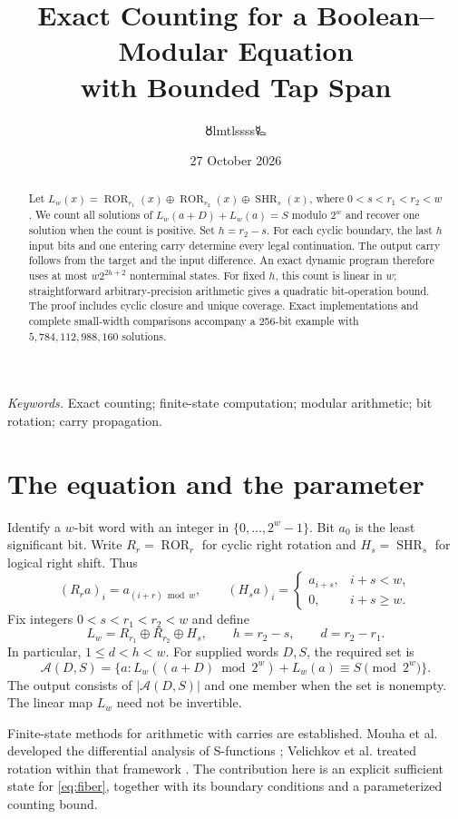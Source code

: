 \documentclass[11pt,a4paper]{article}
\title{\LARGE Exact Counting for a Boolean--Modular Equation\\with Bounded Tap Span}
\author{{\authorsymbol 🜘}lmtlssss{\authorsymbol 🜐}}
\date{27 October 2026}
\theoremstyle{definition}\newtheorem{definition}[theorem]{Definition}
\newcommand{\rot}{\operatorname{ROR}}
\newcommand{\shr}{\operatorname{SHR}}
\begin{document}
\maketitle\thispagestyle{plain}
\begin{abstract}
Let $L_w(x)=\rot_{r_1}(x)\oplus\rot_{r_2}(x)\oplus\shr_s(x)$, where
$0<s<r_1<r_2<w$. We count all solutions of
$L_w(a+D)+L_w(a)=S$ modulo $2^w$ and recover one solution when the count is positive.
Set $h=r_2-s$. For each cyclic boundary, the last $h$ input bits and one entering
carry determine every legal continuation. The output carry follows from the target
and the input difference. An exact dynamic program therefore uses at most
$w2^{2h+2}$ nonterminal states. For fixed $h$, this count is linear in $w$;
straightforward arbitrary-precision arithmetic gives a quadratic bit-operation bound.
The proof includes cyclic closure and unique coverage. Exact implementations and
complete small-width comparisons accompany a 256-bit example with
$5{,}784{,}112{,}988{,}160$ solutions.
\end{abstract}
\noindent\textit{Keywords.} Exact counting; finite-state computation; modular arithmetic;
bit rotation; carry propagation.

\section{The equation and the parameter}
Identify a $w$-bit word with an integer in $\{0,\ldots,2^w-1\}$.
Bit $a_0$ is the least significant bit. Write $R_r=\rot_r$ for cyclic right
rotation and $H_s=\shr_s$ for logical right shift. Thus
\[
 (R_ra)_i=a_{(i+r)\bmod w},\qquad
 (H_sa)_i=\begin{cases}a_{i+s},&i+s<w,\\0,&i+s\geq w.\end{cases}
\]
Fix integers $0<s<r_1<r_2<w$ and define
\begin{equation}\label{eq:map}
 L_w=R_{r_1}\oplus R_{r_2}\oplus H_s,
 \qquad h=r_2-s,\qquad d=r_2-r_1.
\end{equation}
In particular, $1\leq d<h<w$. For supplied words $D,S$, the required set is
\begin{equation}\label{eq:fiber}
 \mathcal A(D,S)=\{a:L_w((a+D)\bmod 2^w)+L_w(a)\equiv S\pmod{2^w}\}.
\end{equation}
The output consists of $|\mathcal A(D,S)|$ and one member when the set is nonempty.
The linear map $L_w$ need not be invertible.

Finite-state methods for arithmetic with carries are established.
Mouha et al. developed the differential analysis of S-functions
\cite{mouha2011}; Velichkov et al. treated rotation within that framework
\cite{velichkov2011}. The contribution here is an explicit sufficient state
for \eqref{eq:fiber}, together with its boundary conditions and a parameterized
counting bound.
\end{document}
